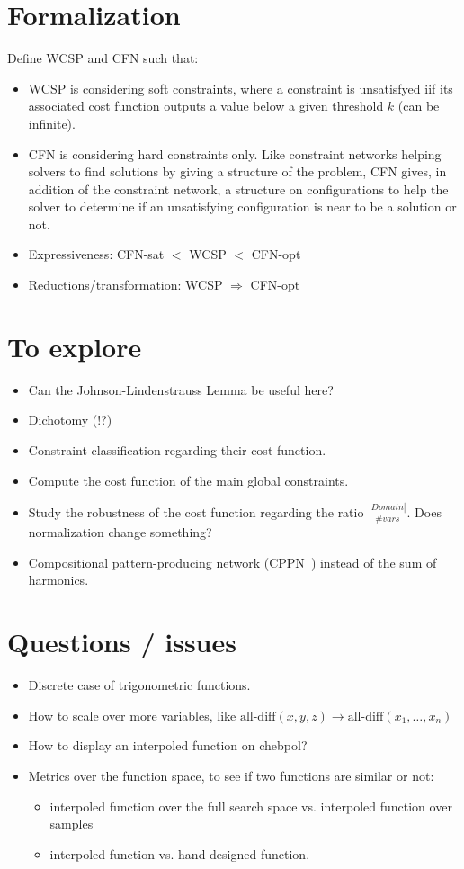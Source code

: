 \documentclass[a4paper, 12pt]{article}
\begin{document}
\section{Formalization}
Define WCSP and CFN such that:
\begin{itemize}
\item  WCSP is  considering soft  constraints, where  a constraint  is
  unsatisfyed iif its associated cost function outputs a value below a
  given threshold $k$ (can be infinite).
\item  CFN  is  considering  hard constraints  only.  Like  constraint
  networks helping solvers to find  solutions by giving a structure of
  the problem,  CFN gives,  in addition of  the constraint  network, a
  structure on  configurations to help  the solver to determine  if an
  unsatisfying configuration is near to be a solution or not.
\item Expressiveness: CFN-sat $<$ WCSP $<$ CFN-opt
\item Reductions/transformation: WCSP $\Rightarrow$ CFN-opt
\end{itemize}

\section{To explore}
\begin{itemize}
\item Can the Johnson-Lindenstrauss Lemma be useful here?
\item Dichotomy (!?)
\item Constraint classification regarding their cost function.
\item Compute the cost function of the main global constraints.
\item Study the robustness of the cost function regarding the ratio $\frac{|Domain|}{\# vars}$. Does normalization change something?
\item Compositional pattern-producing network (CPPN~\cite{CPPN}) instead of the sum of harmonics.
\end{itemize}

\section{Questions / issues}
\begin{itemize}
\item Discrete case of trigonometric functions.
\item How to scale over more variables, like $\text{all-diff}(x, y, z)
  \rightarrow \text{all-diff}(x_1, \ldots, x_n)$
\item How to display an interpoled function on chebpol?
\item Metrics  over the function  space, to  see if two  functions are
  similar or not:
  \begin{itemize}
  \item interpoled function over the  full search space vs. interpoled
    function over samples
  \item interpoled function vs. hand-designed function.
  \end{itemize}
\end{itemize}




\end{document}
